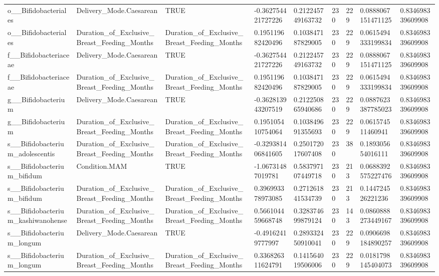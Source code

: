 \begin{longtable}{lllllllll}
o\_\_Bifidobacteriales & Delivery\_Mode.Caesarean & TRUE & -0.362754421727226 & 0.212245749163732 & 230 & 229 & 0.0888067151471125 & 0.834698339609908 \\
o\_\_Bifidobacteriales & Duration\_of\_Exclusive\_Breast\_Feeding\_Months & Duration\_of\_Exclusive\_Breast\_Feeding\_Months & 0.195119682420496 & 0.103847187829005 & 230 & 229 & 0.0615494333199834 & 0.834698339609908 \\
f\_\_Bifidobacteriaceae & Delivery\_Mode.Caesarean & TRUE & -0.362754421727226 & 0.212245749163732 & 230 & 229 & 0.0888067151471125 & 0.834698339609908 \\
f\_\_Bifidobacteriaceae & Duration\_of\_Exclusive\_Breast\_Feeding\_Months & Duration\_of\_Exclusive\_Breast\_Feeding\_Months & 0.195119682420496 & 0.103847187829005 & 230 & 229 & 0.0615494333199834 & 0.834698339609908 \\
g\_\_Bifidobacterium & Delivery\_Mode.Caesarean & TRUE & -0.362813943207519 & 0.212250865940686 & 230 & 229 & 0.0887623387785023 & 0.834698339609908 \\
g\_\_Bifidobacterium & Duration\_of\_Exclusive\_Breast\_Feeding\_Months & Duration\_of\_Exclusive\_Breast\_Feeding\_Months & 0.195105410754064 & 0.103849691355693 & 230 & 229 & 0.061574511460941 & 0.834698339609908 \\
s\_\_Bifidobacterium\_adolescentis & Duration\_of\_Exclusive\_Breast\_Feeding\_Months & Duration\_of\_Exclusive\_Breast\_Feeding\_Months & -0.329381406841605 & 0.250172017607408 & 230 & 38 & 0.189305654016111 & 0.834698339609908 \\
s\_\_Bifidobacterium\_bifidum & Condition.MAM & TRUE & -1.06731487019781 & 0.583797107449718 & 230 & 213 & 0.0688392575227476 & 0.834698339609908 \\
s\_\_Bifidobacterium\_bifidum & Duration\_of\_Exclusive\_Breast\_Feeding\_Months & Duration\_of\_Exclusive\_Breast\_Feeding\_Months & 0.396993378973085 & 0.271261841534739 & 230 & 213 & 0.144724526221236 & 0.834698339609908 \\
s\_\_Bifidobacterium\_kashiwanohense & Duration\_of\_Exclusive\_Breast\_Feeding\_Months & Duration\_of\_Exclusive\_Breast\_Feeding\_Months & 0.566104459668748 & 0.328374699879124 & 230 & 143 & 0.0860888273449167 & 0.834698339609908 \\
s\_\_Bifidobacterium\_longum & Delivery\_Mode.Caesarean & TRUE & -0.49162419777997 & 0.289332450910041 & 230 & 229 & 0.0906698184890257 & 0.834698339609908 \\
s\_\_Bifidobacterium\_longum & Duration\_of\_Exclusive\_Breast\_Feeding\_Months & Duration\_of\_Exclusive\_Breast\_Feeding\_Months & 0.336826311624791 & 0.141564019506006 & 230 & 229 & 0.0181798145404073 & 0.834698339609908 \\

\end{longtable}
